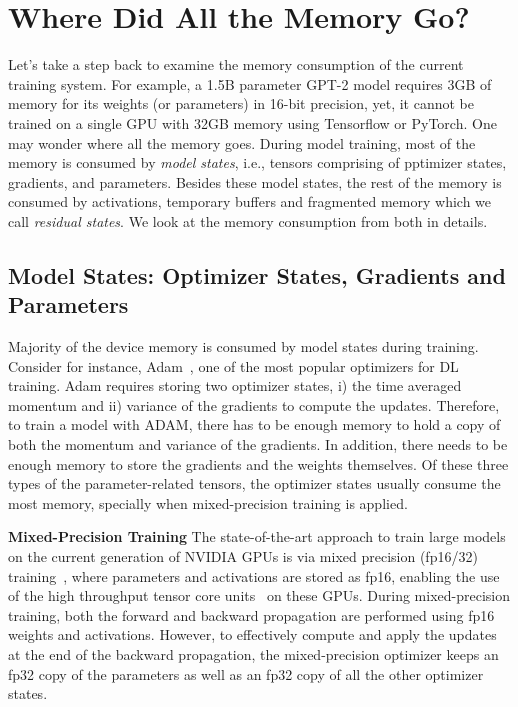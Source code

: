 \section{Where Did All the Memory Go?}
Let's take a step back to examine the memory consumption of the current training system.  For example,  a 1.5B parameter GPT-2 model requires 3GB of memory for its weights (or parameters) in 16-bit precision, yet, it cannot be trained on a single GPU with 32GB memory using Tensorflow or PyTorch.  One may wonder where all the memory goes.
During model training, most of the memory is consumed by {\it model states}, i.e., tensors comprising of pptimizer states, gradients, and parameters. Besides these model states, the rest of the memory is consumed by activations, temporary buffers and fragmented memory which we call \emph{residual states}. We look at the memory consumption from both in details.
\begin{comment}
and iii) temporary buffers. It is possible to trivially  Here we look at the memory consumed by latter two of the three.
\end{comment}

\subsection{Model States: Optimizer States, Gradients and Parameters} Majority of the device memory is consumed by model states during training.  Consider for instance, Adam~\cite{DBLP:journals/corr/Adam}, one of the most popular optimizers for DL training. Adam requires storing two optimizer states, i) the time averaged momentum and ii) variance of the gradients to compute the updates. Therefore, to train a model with ADAM, there has to be enough memory to hold a copy of both the momentum and variance of the gradients. In addition, there needs to be enough memory to store the gradients and the weights themselves. Of these three types of the parameter-related tensors, the optimizer states usually consume the most memory, specially when mixed-precision training is applied.

\textbf{Mixed-Precision Training} The state-of-the-art approach to train large models on the current generation of NVIDIA GPUs is via mixed precision (fp16/32) training~\cite{micikevicius2017mixed}, where parameters and activations are stored as fp16, enabling the use of the high throughput tensor core units~\cite{nvidia-volta-arch} on these GPUs. During mixed-precision training, both the forward and backward propagation are performed using fp16 weights and activations. However, to effectively compute and apply the updates at the end of the backward propagation, the mixed-precision optimizer keeps an fp32 copy of the parameters as well as an fp32 copy of all the other optimizer states. 

